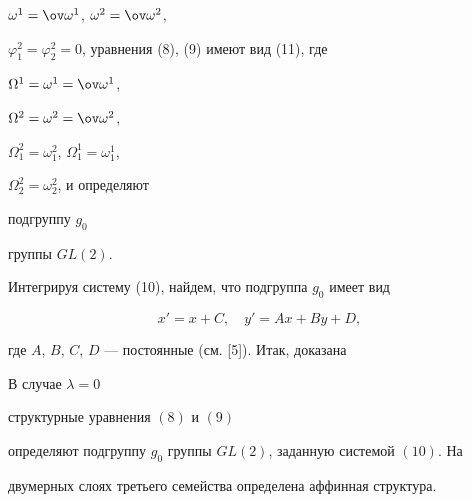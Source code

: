 $\omega^1=\ov\omega^1$, $\omega^2=\ov\omega^2$, 


$\varphi^2_1=\varphi^2_2=0$, уравнения (8), (9) имеют вид (11), где 


$\Omega^1=\omega^1=\ov\omega^1$, 


$\Omega^2=\omega^2=\ov\omega^2$, 


$\Omega^2_1=\omega^2_1$, $\Omega^1_1=\omega^1_1$, 


$\Omega^2_2=\omega^2_2$, и определяют 


подгруппу $g_0$ 


группы $GL(2)$. 


 


Интегрируя систему (10), найдем, что подгруппа $g_0$ имеет вид 


\begin{equation} 


x'=x+C,\quad y'=Ax+By+D, 


\end{equation} 


где $A$, $B$, $C$, $D$ --- постоянные (см. [5]). Итак, доказана 


 


\begin{thmnonum} В случае $\lambda=0$ 


структурные уравнения $(8)$ и $(9)$ 


определяют подгруппу $g_0$ группы $GL(2)$, заданную системой $(10)$. На 


двумерных слоях третьего семейства определена аффинная структура. 


\end{thmnonum} 


 


